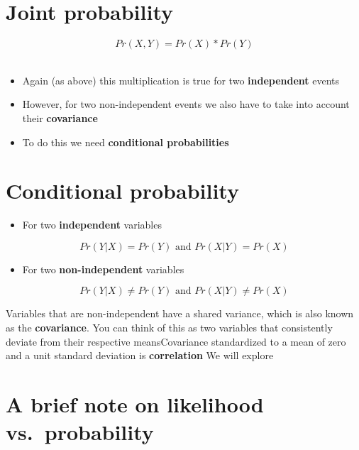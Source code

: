 \documentclass[]{book}
\providecommand{\tightlist}{%
  \setlength{\itemsep}{0pt}\setlength{\parskip}{0pt}}
\begin{document}
\hypertarget{joint-probability}{%
\section{Joint probability}\label{joint-probability}}

\[Pr(X,Y) = Pr(X) * Pr(Y)\]\\

\begin{itemize}
\tightlist
\item
  Again (as above) this multiplication is true for two \textbf{independent} events
\item
  However, for two non-independent events we also have to take into account their \textbf{covariance}
\item
  To do this we need \textbf{conditional probabilities}
\end{itemize}

\hypertarget{conditional-probability}{%
\section{Conditional probability}\label{conditional-probability}}

\begin{itemize}
\tightlist
\item
  For two \textbf{independent} variables
\end{itemize}

\[Pr(Y|X) = Pr(Y)\text{ and }Pr(X|Y) = Pr(X)\]

\begin{itemize}
\tightlist
\item
  For two \textbf{non-independent} variables
\end{itemize}

\[Pr(Y|X) \neq Pr(Y)\text{ and }Pr(X|Y) \neq Pr(X)\]

Variables that are non-independent have a shared variance, which is also known as the \textbf{covariance}. You can think of this as two variables that consistently deviate from their respective meansCovariance standardized to a mean of zero and a unit standard deviation is \textbf{correlation} We will explore

\hypertarget{a-brief-note-on-likelihood-vs.probability}{%
\section{A brief note on likelihood vs.~probability}\label{a-brief-note-on-likelihood-vs.probability}}
\end{document}
